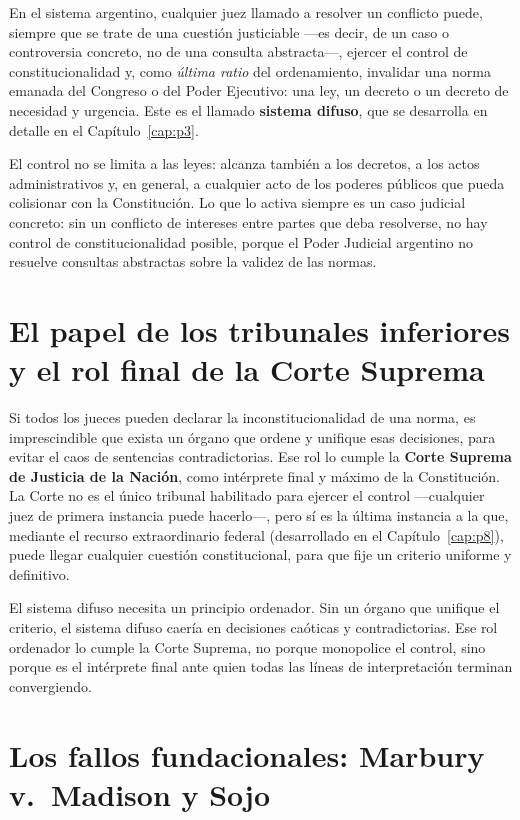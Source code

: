 \documentclass[12pt,oneside]{book}
\begin{document}
En el sistema argentino, cualquier juez llamado a resolver un conflicto puede,
siempre que se trate de una cuestión justiciable —es decir, de un caso o
controversia concreto, no de una consulta abstracta—, ejercer el control de
constitucionalidad y, como \textit{última ratio} del ordenamiento, invalidar una
norma emanada del Congreso o del Poder Ejecutivo: una ley, un decreto o un decreto
de necesidad y urgencia. Este es el llamado \textbf{sistema difuso}, que se
desarrolla en detalle en el Capítulo~\ref{cap:p3}.

El control no se limita a las leyes: alcanza también a los decretos, a los actos
administrativos y, en general, a cualquier acto de los poderes públicos que pueda
colisionar con la Constitución. Lo que lo activa siempre es un caso judicial
concreto: sin un conflicto de intereses entre partes que deba resolverse, no hay
control de constitucionalidad posible, porque el Poder Judicial argentino no
resuelve consultas abstractas sobre la validez de las normas.

\section{El papel de los tribunales inferiores y el rol final de la Corte Suprema}

Si todos los jueces pueden declarar la inconstitucionalidad de una norma, es
imprescindible que exista un órgano que ordene y unifique esas decisiones, para
evitar el caos de sentencias contradictorias. Ese rol lo cumple la \textbf{Corte
Suprema de Justicia de la Nación}, como intérprete final y máximo de la
Constitución. La Corte no es el único tribunal habilitado para ejercer el control
—cualquier juez de primera instancia puede hacerlo—, pero sí es la última instancia
a la que, mediante el recurso extraordinario federal (desarrollado en el
Capítulo~\ref{cap:p8}), puede llegar cualquier cuestión constitucional, para que
fije un criterio uniforme y definitivo.

\begin{impbox}
El sistema difuso necesita un principio ordenador. Sin un órgano que unifique el
criterio, el sistema difuso caería en decisiones caóticas y contradictorias. Ese
rol ordenador lo cumple la Corte Suprema, no porque monopolice el control, sino
porque es el intérprete final ante quien todas las líneas de interpretación
terminan convergiendo.
\end{impbox}

\section{Los fallos fundacionales: Marbury v.\ Madison y Sojo}
\end{document}
